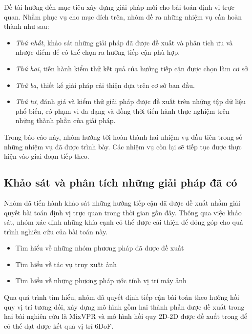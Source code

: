 Đề tài hướng đến mục tiêu xây dựng giải pháp mới cho bài toán định vị trực quan. Nhằm phục vụ cho mục đích trên, nhóm đề ra những nhiệm vụ cần hoàn thành như sau:
\begin{itemize}
    \item \textit{Thứ nhất}, khảo sát những giải pháp đã được đề xuất và phân tích ưu và nhược điểm để có thể chọn ra hướng tiếp cận phù hợp.
    \item \textit{Thứ hai}, tiến hành kiểm thử kết quả của hướng tiếp cận được chọn làm cơ sở
    \item \textit{Thứ ba}, thiết kế giải pháp cải thiện dựa trên cơ sở ban đầu.
    \item \textit{Thứ tư}, đánh giá và kiểm thử giải pháp được đề xuất trên những tập dữ liệu phổ biến, có phạm vi đa dạng và đồng thời tiến hành thực nghiệm trên những thành phần của giải pháp.
\end{itemize}

Trong báo cáo này, nhóm hướng tới hoàn thành hai nhiệm vụ đầu tiên trong số những nhiệm vụ đã được trình bày. Các nhiệm vụ còn lại sẽ tiếp tục được thực hiện vào giai đoạn tiếp theo.

\subsection{Khảo sát và phân tích những giải pháp đã có}
Nhóm đã tiến hành khảo sát những hướng tiếp cận đã được đề xuất nhằm giải quyết bài toán định vị trực quan trong thời gian gần đây. Thông qua việc khảo sát, nhóm xác định những khía cạnh có thể được cải thiện để đóng góp cho quá trình nghiên cứu của bài toán này.
\begin{itemize}
    \item Tìm hiểu về những nhóm phương pháp đã được đề xuất
    \item Tìm hiểu về tác vụ truy xuất ảnh
    \item Tìm hiểu về những phương pháp ước tính vị trí máy ảnh
\end{itemize}

Qua quá trình tìm hiểu, nhóm đã quyết định tiếp cận bài toán theo hướng hồi quy vị trí tương đối, xây dựng mô hình gồm hai thành phần được đề xuất trong hai bài nghiên cứu là MixVPR \cite{alibey2023mixvpr} và mô hình hồi quy 2D-2D được đề xuất trong \cite{arnold2022mapfree} để có thể đạt được kết quả vị trí 6DoF.

